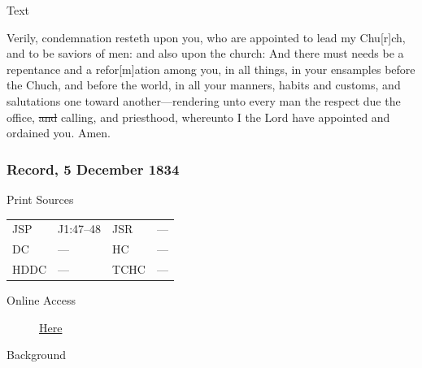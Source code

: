				\begin{description}
					\item[Text]
				\end{description}
				
					Verily, condemnation resteth upon you, who are appointed to lead my Chu[r]ch, and to be saviors of men: and also upon the church: And there must needs be a repentance and a refor[m]ation among you, in all things, in your ensamples before the Chuch, and before the world, in all your manners, habits and customs, and salutations one toward another---rendering unto every man the respect due the office, \sout{and} calling, and priesthood, whereunto I the Lord have appointed and ordained you. Amen.
					
		\subsubsection{Record, 5 December 1834}
			\label{EMS-1834-JS-5-DEC-1834-REC}
			
			\begin{description}
					\item[Print Sources]
				\end{description}

					\begin{tabular}{p{0.5in}p{1in}p{0.5in}p{1in}}
					JSP	 	& J1:47--48		& JSR 		& --- \\
					DC	 	& --- 		& HC 		& --- \\
					HDDC 	& ---		& TCHC 		& --- \\
					\end{tabular}
				
				\begin{description}
					\item[Online Access] \href{https://www.josephsmithpapers.org/paper-summary/journal-1832-1834/94}{Here}
				\end{description}
				
				\begin{description}
					\item[Background]
				\end{description}
				
				
